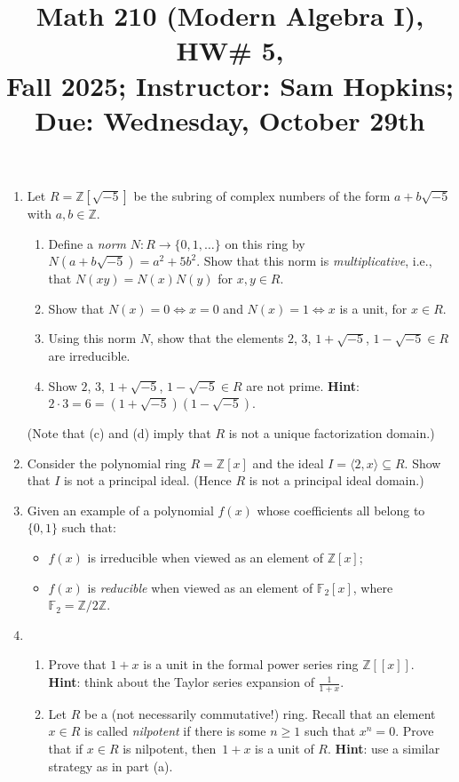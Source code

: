 \documentclass[11pt]{article}
\title{Math 210 (Modern Algebra I), HW\# 5, \\ {\normalsize Fall 2025; Instructor: Sam Hopkins; Due: Wednesday, October 29th}}
\date{}
\begin{document}
\maketitle

\thispagestyle{empty}

\begin{enumerate}

\item Let $R=\mathbb{Z}[\sqrt{-5}]$ be the subring of complex numbers of the form $a+b\sqrt{-5}$ with $a,b\in \mathbb{Z}$.
\begin{enumerate}
\item Define a \emph{norm} $N\colon R \to \{0,1,\ldots\}$ on this ring by $N(a+b\sqrt{-5})=a^2+5b^2$. Show that this norm is \emph{multiplicative}, i.e., that $N(xy)=N(x)N(y)$ for $x,y\in R$.
\item Show that $N(x)=0 \Leftrightarrow x=0$ and $N(x)=1 \Leftrightarrow x$ is a unit, for $x \in R$.
\item Using this norm $N$, show that the elements $2$, $3$, $1+\sqrt{-5}$, $1-\sqrt{-5} \in R$ are irreducible.
\item Show $2$, $3$, $1+\sqrt{-5}$, $1-\sqrt{-5} \in R$ are not prime. {\bf Hint}: $2 \cdot 3 = 6 = (1+\sqrt{-5})(1-\sqrt{-5})$.
\end{enumerate}
(Note that (c) and (d) imply that $R$ is not a unique factorization domain.)

\item Consider the polynomial ring $R=\mathbb{Z}[x]$ and the ideal $I=\langle 2, x \rangle \subseteq R$. Show that $I$ is not a principal ideal. (Hence $R$ is not a principal ideal domain.)

\item Given an example of a polynomial $f(x)$ whose coefficients all belong to $\{0,1\}$ such that:
\begin{itemize}
\item $f(x)$ is irreducible when viewed as an element of $\mathbb{Z}[x]$;
\item $f(x)$ is \emph{reducible} when viewed as an element of $\mathbb{F}_2[x]$, where $\mathbb{F}_2=\mathbb{Z}/2\mathbb{Z}$.
\end{itemize}

\item \begin{enumerate}
\item Prove that $1+x$ is a unit in the formal power series ring $\mathbb{Z}[[x]]$. \\{\bf Hint}: think about the Taylor series expansion of $\frac{1}{1+x}$.
\item Let $R$ be a (not necessarily commutative!) ring. Recall that an element $x \in R$ is called \emph{nilpotent} if there is some $n\geq 1$ such that $x^n=0$. Prove that if $x \in R$ is nilpotent, then~$1+x$ is a unit of $R$. {\bf Hint}: use a similar strategy as in part (a).
\end{enumerate}


\end{enumerate}
\end{document}
